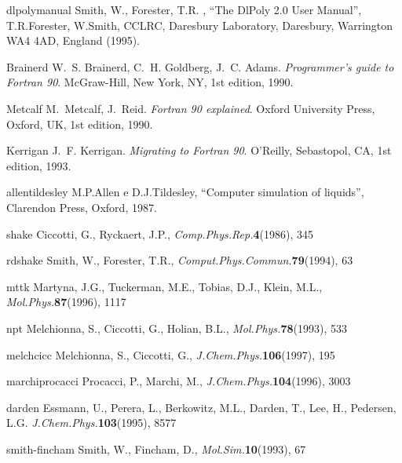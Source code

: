 \bb
{dlpolymanual}
Smith, W., Forester, T.R. , ``The DlPoly 2.0 User Manual'', 
T.R.Forester, W.Smith,
CCLRC, Daresbury Laboratory, Daresbury, Warrington WA4 4AD, England (1995).

\bb
{Brainerd}
W.~S. Brainerd, C.~H. Goldberg, J.~C. Adams.
{\em Programmer's guide to Fortran 90}.
McGraw-Hill, New York, NY, 1st edition, 1990.

\bb
{Metcalf}
M.~Metcalf, J.~Reid.
{\em Fortran 90 explained}.
Oxford University Press, Oxford, UK, 1st edition, 1990.

\bb
{Kerrigan}
J.~F. Kerrigan.
{\em Migrating to Fortran 90}.
O'Reilly, Sebastopol, CA, 1st edition, 1993.

\bb
{allentildesley}
M.P.Allen e D.J.Tildesley, ``Computer simulation of liquids'',
Clarendon Press, Oxford, 1987.

\bb
{shake}
Ciccotti, G., Ryckaert, J.P., 
{\it Comp.Phys.Rep.}{\bf 4}(1986), 345

\bb
{rdshake}
Smith, W., Forester, T.R.,
{\it Comput.Phys.Commun.}{\bf 79}(1994), 63

\bb
{mttk}
Martyna, J.G., Tuckerman, M.E., Tobias, D.J., Klein, M.L.,
{\it Mol.Phys.}{\bf 87}(1996), 1117

\bb
{npt}
Melchionna, S., Ciccotti, G., Holian, B.L.,
{\it Mol.Phys.}{\bf 78}(1993), 533

\bb
{melchcicc}
Melchionna, S., Ciccotti, G., 
{\it J.Chem.Phys.}{\bf 106}(1997), 195

\bb
{marchiprocacci}
Procacci, P., Marchi, M., 
{\it J.Chem.Phys.}{\bf 104}(1996), 3003

\bb
{darden}
Essmann, U., Perera, L., Berkowitz, M.L., Darden, T., 
Lee, H., Pedersen, L.G.
{\it J.Chem.Phys.}{\bf 103}(1995), 8577

\bb
{smith-fincham}
Smith, W., Fincham, D.,
{\it Mol.Sim.}{\bf 10}(1993), 67



